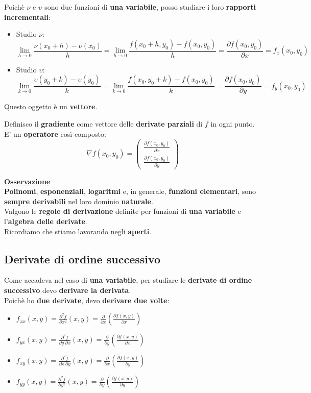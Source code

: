 \documentclass[a4paper, oneside]{article}
\newcommand\de{\partial}
\begin{document}
    \noindent Poichè $\nu$ e $\upsilon$ sono due funzioni di \textbf{una variabile}, posso studiare i loro \textbf{rapporti incrementali}:
    \begin{itemize}
        \item Studio $\nu$:
        \[\lim_{h\to 0} \frac{\nu(x_0 + h) - \nu(x_0)}{h} = \lim_{h\to 0} \frac{f(x_0 + h,y_0) - f(x_0,y_0)}{h} = \frac{\de f(x_0,y_0)}{\de x} = f_x (x_0,y_0)\]
        \item Studio $\upsilon$:
        \[\lim_{k\to 0} \frac{\upsilon(y_0 + k) - \upsilon(y_0)}{k} = \lim_{k\to 0} \frac{f(x_0,y_0 + k) - f(x_0,y_0)}{k} = \frac{\de f(x_0,y_0)}{\de y} = f_y (x_0,y_0)\]
    \end{itemize}

    \noindent Questo oggetto è un \textbf{vettore}. 
    \begin{definition}
        Definisco il \textbf{gradiente} come vettore delle \textbf{derivate parziali} di $f$ in ogni punto. E' un \textbf{operatore} così composto:
        \[\nabla f(x_0,y_0) = \begin{pmatrix}
            \frac{\de f(x_0,y_0)}{\de x} \\ \frac{\de f(x_0,y_0)}{\de y}
        \end{pmatrix}\]
    \end{definition}

    \noindent\textbf{\underline{Osservazione}}\\
    \textbf{Polinomi}, \textbf{esponenziali}, \textbf{logaritmi} e, in generale, \textbf{funzioni elementari}, sono \textbf{sempre derivabili} nel loro dominio \textbf{naturale}.\\
    Valgono le \textbf{regole di derivazione} definite per funzioni di \textbf{una variabile} e l'\textbf{algebra delle derivate}. \\
    Ricordiamo che stiamo lavorando negli \textbf{aperti}.

    \subsection{Derivate di ordine successivo}

    Come accadeva nel caso di \textbf{una variabile}, per studiare le \textbf{derivate di ordine successivo} devo \textbf{derivare la derivata}. \\
    Poichè ho \textbf{due derivate}, devo \textbf{derivare due volte}:
    \begin{itemize}
        \item $\displaystyle f_{xx}(x,y) = \frac{\de^2 f}{\de x^2} (x,y) = \frac{\de}{\de x}\left(\frac{\de f(x,y)}{\de x}\right)$
        \item $\displaystyle f_{yx}(x,y) =\frac{\de^2 f}{\de y \ \de x} (x,y) = \frac{\de}{\de y}\left(\frac{\de f(x,y)}{\de x}\right)$
        \item $\displaystyle f_{xy}(x,y) =\frac{\de^2 f}{\de x \ \de y} (x,y) = \frac{\de}{\de x}\left(\frac{\de f(x,y)}{\de y}\right)$
        \item $\displaystyle f_{yy}(x,y) =\frac{\de^2 f}{\de y^2} (x,y) = \frac{\de}{\de y}\left(\frac{\de f(x,y)}{\de y}\right)$
    \end{itemize}
\end{document}

